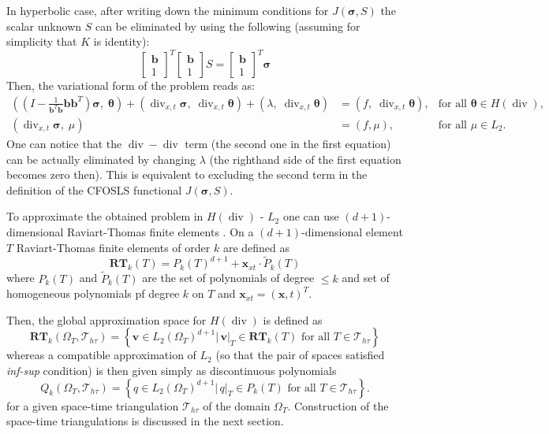 \documentclass[12pt]{article}
\renewcommand{\div}{\operatorname{div}}
\def\bb{{\mathbf b}}
\def\btheta{{\boldsymbol \theta}}
\def\bsigma{{\boldsymbol \sigma}}
\begin{document}
In hyperbolic case, after writing down the minimum conditions for $J(\bsigma,S)$ the scalar unknown $S$  can be eliminated by using the following (assuming for simplicity that $K$ is identity):
$$
\left[ 
\begin{array}{c} \mathbf{b} \\ 1 \end{array}
\right]^T
\left[ 
\begin{array}{c} \mathbf{b} \\ 1 \end{array}
\right]
 S = \left[ 
\begin{array}{c} \mathbf{b} \\ 1 \end{array}
\right]^T \bsigma
$$
Then, the variational form of the problem reads as:
$$
\begin{array}{lll}
((I- \frac{1}{\bb^T\bb} \bb\bb^T) \bsigma,\;\btheta)+(\div_{x,t} \bsigma,\;\div_{x,t} \btheta)+(\lambda,\;\div_{x,t} \btheta)&= (f,\;\div_{x,t} \btheta),&\text{for all }\btheta \in H(\div),\\
(\div_{x,t} \bsigma,\;\mu)&= (f,\mu),&\text{for all }\mu \in L_2.
\end{array}
$$
One can notice that the $\div-\div$ term (the second one in the first equation) can be actually eliminated by changing $\lambda$ (the righthand side of the first equation becomes zero then). This is equivalent to excluding the second term in the definition of the CFOSLS functional $J(\bsigma,S)$.

To approximate the obtained problem in $H(\div)$ - $L_2$ one can use $(d+1)$-dimensional Raviart-Thomas finite elements \cite{RT}. On a $(d+1)$-dimensional element $T$ Raviart-Thomas finite elements of order $k$ are defined as
$$
\mathbf{RT}_k(T) = P_k(T)^{d+1} + \mathbf{x}_{xt} \cdot \tilde{P}_k(T)
$$
where $P_k(T)$ and $\tilde{P}_k(T)$ are the set of polynomials of degree $\leq k$ and set of homogeneous polynomials pf degree $k$ on $T$ and $\mathbf{x}_{xt} = (\mathbf{x},t)^T$. 

Then, the global approximation space for $H(\div)$ is defined as 
$$
\mathbf{RT}_k(\Omega_T, \mathcal{T}_{h\tau}) = \left\{ \mathbf{v} \in L_2(\Omega_T)^{d+1} | \, \mathbf{v} |_T \in \mathbf{RT}_k(T) \, \, \text{for all} \, \, T \in \mathcal{T}_{h\tau} \right\}
$$
whereas a compatible approximation of $L_2$ (so that the pair of spaces satisfied \textit{inf-sup} condition) is then given simply as discontinuous polynomials
$$
Q_k (\Omega_T, \mathcal{T}_{h\tau}) = \left\{ q \in L_2(\Omega_T)^{d+1} | \, q |_T \in P_k(T) \, \, \text{for all} \, \, T \in \mathcal{T}_{h\tau} \right\}.
$$
for a given space-time triangulation $\mathcal{T}_{h\tau}$ of the domain $\Omega_T$. Construction of the space-time triangulations is discussed in the next section.
\end{document}
